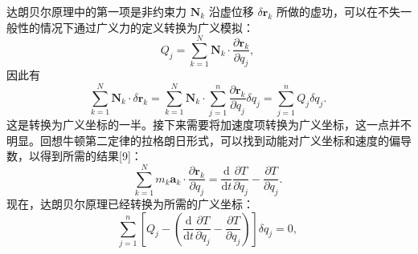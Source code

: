 达朗贝尔原理中的第一项是非约束力 \( \mathbf{N}_k \) 沿虚位移 \( \delta \mathbf{r}_k \) 所做的虚功，可以在不失一般性的情况下通过广义力的定义转换为广义模拟：
\[
Q_j = \sum_{k=1}^{N} \mathbf{N}_k \cdot \frac{\partial \mathbf{r}_k}{\partial q_j},~
\]
因此有
\[
\sum_{k=1}^{N} \mathbf{N}_k \cdot \delta \mathbf{r}_k = \sum_{k=1}^{N} \mathbf{N}_k \cdot \sum_{j=1}^{n} \frac{\partial \mathbf{r}_k}{\partial q_j} \delta q_j = \sum_{j=1}^{n} Q_j \delta q_j.~
\]
这是转换为广义坐标的一半。接下来需要将加速度项转换为广义坐标，这一点并不明显。回想牛顿第二定律的拉格朗日形式，可以找到动能对广义坐标和速度的偏导数，以得到所需的结果[9]：
\[
\sum_{k=1}^{N} m_k \mathbf{a}_k \cdot \frac{\partial \mathbf{r}_k}{\partial q_j} = \frac{\mathrm{d}}{\mathrm{d} t} \frac{\partial T}{\partial \dot{q}_j} - \frac{\partial T}{\partial q_j}.~
\]
现在，达朗贝尔原理已经转换为所需的广义坐标：
\[
\sum_{j=1}^{n}\left[Q_j - \left(\frac{\mathrm{d}}{\mathrm{d} t} \frac{\partial T}{\partial \dot{q}_j} - \frac{\partial T}{\partial q_j}\right)\right]\delta q_j = 0,~
\]